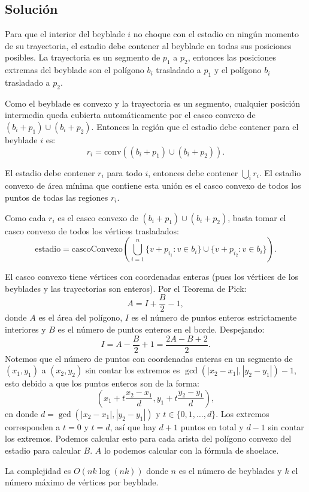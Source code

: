 \subsection*{Solución}
Para que el interior del beyblade $i$ no choque con el estadio en ningún momento de su trayectoria, el estadio debe contener al beyblade en todas sus posiciones posibles. La trayectoria es un segmento de $p_1$ a $p_2$,
entonces las posiciones extremas del beyblade son el polígono $b_i$
trasladado a $p_1$ y el polígono $b_i$ trasladado a $p_2$.
 
Como el beyblade es convexo y la trayectoria es un segmento, cualquier
posición intermedia queda cubierta automáticamente por el casco convexo
de $(b_i + p_1) \cup (b_i + p_2)$. Entonces la región que el estadio
debe contener para el beyblade $i$ es:
\[
r_i = \text{conv}\!\left((b_i + p_1) \cup (b_i + p_2)\right).
\]

El estadio debe contener $r_i$ para todo $i$, entonces debe contener
$\bigcup_i r_i$. El estadio convexo de área mínima que contiene esta
unión es el casco convexo de todos los puntos de todas las
regiones $r_i$.
 
Como cada $r_i$ es el casco convexo de $(b_i + p_1) \cup (b_i + p_2)$,
basta tomar el casco convexo de todos los vértices trasladados:
\[
\text{estadio} = \text{cascoConvexo}\!\left(\bigcup_{i=1}^{n} \{v + p_{i_1} : v \in b_i\} \cup \{v + p_{i_2} : v \in b_i\}\right).
\]

El casco convexo tiene vértices con coordenadas enteras (pues los vértices
de los beyblades y las trayectorias son enteros). Por el Teorema
de Pick:
\[
A = I + \frac{B}{2} - 1,
\]
donde $A$ es el área del polígono, $I$ es el número de puntos enteros
estrictamente interiores y $B$ es el número de puntos enteros en el
borde. Despejando:
\[
I = A - \frac{B}{2} + 1 = \frac{2A - B + 2}{2}.
\]
Notemos que el número de puntos con coordenadas enteras en un segmento de $(x_1,y_1)$ a $(x_2,y_2)$ sin contar los extremos es $\gcd(|x_2-x_1|,|y_2-y_1|)-1$, esto debido a que los puntos enteros son de la forma:
\[(x_1+t\frac{x_2-x_1}{d},y_1+t\frac{y_2-y_1}{d}),\]
en donde $d=\gcd(|x_2-x_1|,|y_2-y_1|)$ y $t\in \{0,1,\ldots, d\}$. Los extremos corresponden a $t=0$ y $t=d$, así que hay $d+1$ puntos en total y $d-1$ sin contar los extremos. Podemos calcular esto para cada arista del polígono convexo del estadio para calcular $B$. $A$ lo podemos calcular con la fórmula de shoelace.

La complejidad es $O(nk \log(nk))$ donde $n$ es el número de beyblades y $k$ el número máximo de vértices por beyblade.

